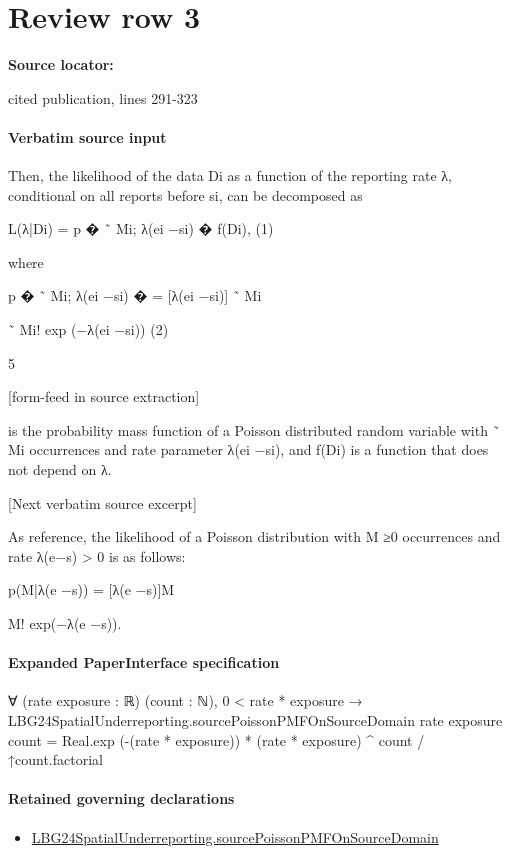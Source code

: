 \documentclass[10pt]{article}
\begin{document}
\section*{Review row 3}
\textbf{Source locator:} {\footnotesize\raggedright cited publication, lines 291-\allowbreak{}323\par}
\paragraph{Verbatim source input}
\begin{ReviewVerbatim}
Then, the likelihood of the data Di as a function of the reporting rate λ, conditional on all
reports before si, can be decomposed as

L(λ|Di) = p
�
˜
Mi; λ(ei −si)
�
f(Di),
(1)

where

p
�
˜
Mi; λ(ei −si)
�
= [λ(ei −si)]
˜
Mi

˜
Mi!
exp (−λ(ei −si))
(2)

5


[form-feed in source extraction]

is the probability mass function of a Poisson distributed random variable with ˜
Mi occurrences and
rate parameter λ(ei −si), and f(Di) is a function that does not depend on λ.

[Next verbatim source excerpt]

As reference, the likelihood of a Poisson distribution with M ≥0 occurrences and rate λ(e−s) >
0 is as follows:

p(M|λ(e −s)) = [λ(e −s)]M

M!
exp(−λ(e −s)).
\end{ReviewVerbatim}



\paragraph{Expanded PaperInterface specification}
\begin{ReviewVerbatim}
∀ (rate exposure : ℝ) (count : ℕ),
  0 < rate * exposure →
    LBG24SpatialUnderreporting.sourcePoissonPMFOnSourceDomain rate exposure count =
      Real.exp (-(rate * exposure)) * (rate * exposure) ^ count / ↑count.factorial
\end{ReviewVerbatim}

\paragraph{Retained governing declarations}
\begin{itemize}\raggedright
\item \hyperlink{governing-declaration-9a24d22062827cef}{LBG24\allowbreak{}Spatial\allowbreak{}Underreporting.\allowbreak{}source\allowbreak{}Poisson\allowbreak{}PMF\allowbreak{}On\allowbreak{}Source\allowbreak{}Domain}
\end{itemize}
\end{document}

